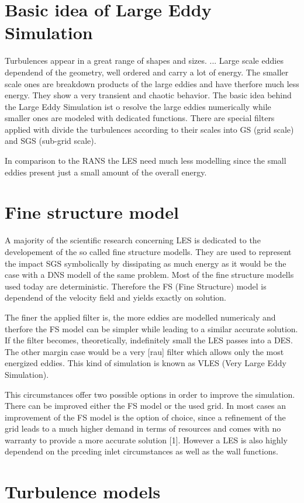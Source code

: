 \section{Basic idea of Large Eddy Simulation}
Turbulences appear in a great range of shapes and sizes. ... 
Large scale eddies dependend of the geometry, well ordered and carry a lot of energy. The smaller scale ones are breakdown products of the large eddies and have therfore much less energy. They show a very transient and chaotic behavior. The basic idea behind the Large Eddy Simulation ist o resolve the large eddies numerically while smaller ones are modeled with dedicated functions. There are special filters applied with divide the turbulences according to their scales into GS (grid scale) and SGS (sub-grid scale).

In comparison to the RANS the LES need much less modelling since the small eddies present just a small amount of the overall energy.
\section{Fine structure model}
A majority of the scientific research concerning LES is dedicated to the developement of the so called fine structure modells. They are used to represent the impact SGS symbolically by dissipating as much energy as it would be the case with a DNS modell of the same problem. Most of the fine structure modells used today are deterministic. Therefore the FS (Fine Structure) model is dependend of the velocity field and yields exactly on solution.

The finer the applied filter is, the more eddies are modelled numericaly and therfore the FS model can be simpler while leading to a similar accurate solution. If the filter becomes, theoretically, indefinitely small the LES passes into a DES. The other margin case would be a very [rau] filter which allows only the most energized eddies. This kind of simulation is known as VLES (Very Large Eddy Simulation).

This circumstances offer two possible options in order to improve the simulation. There can be improved either the FS model or the used grid. In most cases an improvement of the FS model is the option of choice, since a refinement of the grid leads to a much higher demand in terms of resources and comes with no warranty to provide a more accurate solution [1]. However a LES is also highly dependend on the prceding inlet circumstances as well as the wall functions.
\section{Turbulence models}
